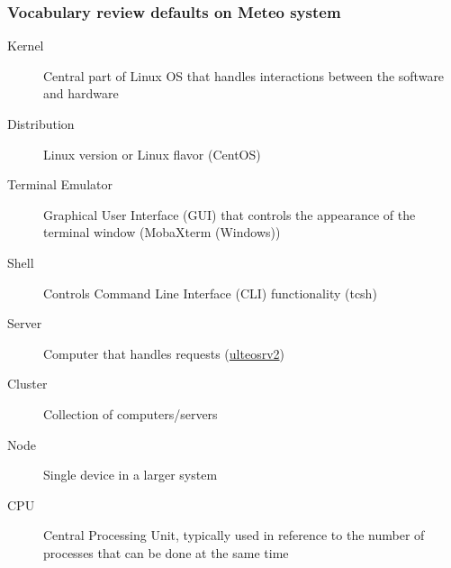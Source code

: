 \documentclass[hyperref,pdfa,unicode,utf8,usepdftitle]{beamer}
\begin{document}
\begin{frame}
  \frametitle{Vocabulary review \textcolor{meteosystemdefault}{defaults on Meteo system}}
  \begin{description}
  \item[Kernel] Central part of Linux OS that handles interactions
    between the software and hardware
  \item[Distribution] Linux version or Linux flavor
    (\textcolor{meteosystemdefault}{CentOS})
  \item[Terminal Emulator] Graphical User Interface (GUI) that
    controls the appearance of the terminal window
    (\textcolor{meteosystemdefault}{MobaXterm (Windows)})
  \item[Shell] Controls Command Line Interface (CLI) functionality
    (\textcolor{meteosystemdefault}{tcsh})
  \item[Server] Computer that handles requests
    (\textcolor{meteosystemdefault}{\url{ulteosrv2}})
  \item[Cluster] Collection of computers/servers
  \item[Node] Single device in a larger system
  \item[CPU] Central Processing Unit, typically used in reference to
    the number of processes that can be done at the same time
  \end{description}
\end{frame}
\end{document}
